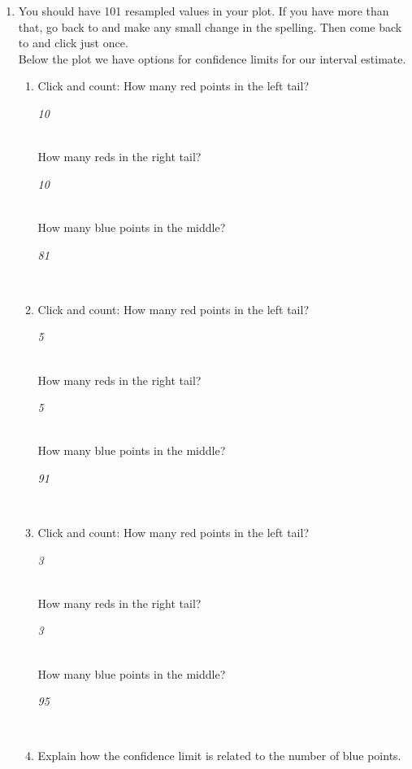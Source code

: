 \begin{enumerate}
 \item You should have 101 resampled values in your plot. If you have
   more than that, go  back to  and make any
   small change in the spelling. Then come back to  and
   click  just once.\\
   Below the plot we have options for confidence limits for our
   interval estimate.
   \begin{enumerate}
   \item Click  and count:  How many red points in the left tail?
\begin{key}
{\it  10}
\end{key}
     \\
     How many reds in the right tail?
\begin{key}
{\it  10}
\end{key}
     \\
     How many blue points in the middle?  
\begin{key}
{\it  81}
\end{key}
     \\
   \item Click  and count:  How many red points in the left tail?
\begin{key}
{\it  5}
\end{key}
     \\
     How many reds in the right tail?
\begin{key}
{\it  5}
\end{key}
     \\
     How many blue points in the middle?
\begin{key}
{\it  91}
\end{key}
     \\
  \item Click  and count:  How many red points in the left tail?
\begin{key}
{\it  3}
\end{key}
     \\
     How many reds in the right tail?
\begin{key}
{\it  3}
\end{key}
     \\
     How many blue points in the middle?
\begin{key}
{\it  95}
\end{key}
     \\
   \item Explain how the confidence limit is related to the number of
     blue points.
\begin{students}
  \vspace{1.5cm}
\end{students}


\end{enumerate}
\end{enumerate}
